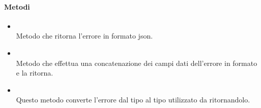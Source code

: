 \paragraph*{Metodi}
\begin{itemize}
\item[]  \\ Metodo che ritorna l'errore in formato json.
\item[]  \\ Metodo che effettua una concatenazione dei campi dati dell'errore in formato  e la ritorna.
\item[]  \\ Questo metodo converte l'errore dal tipo  al tipo  utilizzato da  ritornandolo.
\end{itemize}
